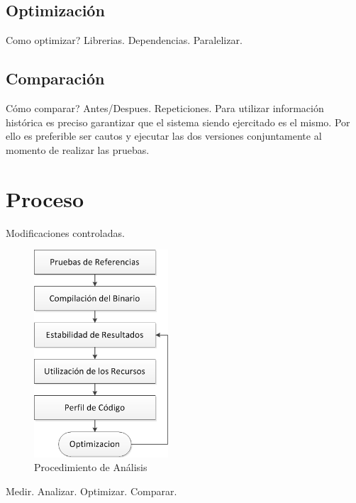 \documentclass[a4paper]{report}
\begin{document}
\subsection{Optimizaci\'on}

Como optimizar? Librerias. Dependencias. Paralelizar.

\subsection{Comparaci\'on}

C\'omo comparar? Antes/Despues. Repeticiones. Para utilizar informaci\'on
hist\'orica es preciso garantizar que el sistema siendo ejercitado es el mismo. Por ello es preferible ser cautos y ejecutar las dos versiones conjuntamente
al momento de realizar las pruebas. 

\section{Proceso}

Modificaciones controladas.

\begin{figure}[H]
\label{fig:procedure}
\begin{center}
\includegraphics[width=5cm]{procedure.png}
\caption{Procedimiento de An\'alisis}
\end{center}
\end{figure}

\bigskip

Medir. Analizar. Optimizar. Comparar.
\end{document}
